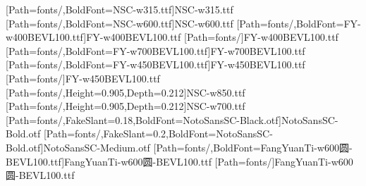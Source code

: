 [Path=fonts/,BoldFont=NSC-w315.ttf]{NSC-w315.ttf}
[Path=fonts/,BoldFont=NSC-w600.ttf]{NSC-w600.ttf}
[Path=fonts/,BoldFont=FY-w400BEVL100.ttf]{FY-w400BEVL100.ttf}
\newfontfamily{\libianlat}[Path=fonts/]{FY-w400BEVL100.ttf}
[Path=fonts/,BoldFont=FY-w700BEVL100.ttf]{FY-w700BEVL100.ttf}
[Path=fonts/,BoldFont=FY-w450BEVL100.ttf]{FY-w450BEVL100.ttf}
\newfontfamily{\libianslat}[Path=fonts/]{FY-w450BEVL100.ttf}
\newfontfamily{\numbold}[Path=fonts/,Height=0.905,Depth=0.212]{NSC-w850.ttf}
\newfontfamily{\numboldjian}[Path=fonts/,Height=0.905,Depth=0.212]{NSC-w700.ttf}
[Path=fonts/,FakeSlant=0.18,BoldFont=NotoSansSC-Black.otf]{NotoSansSC-Bold.otf}
[Path=fonts/,FakeSlant=0.2,BoldFont=NotoSansSC-Bold.otf]{NotoSansSC-Medium.otf}
[Path=fonts/,BoldFont=FangYuanTi-w600圆-BEVL100.ttf]{FangYuanTi-w600圆-BEVL100.ttf}
\newfontfamily{\lilat}[Path=fonts/]{FangYuanTi-w600圆-BEVL100.ttf}
\newcommand{\heiti}{\CJKfamily{hei}}
\newcommand{\heizhang}{\CJKfamily{heizhang}}
\newcommand{\heijie}{\CJKfamily{heijie}}
